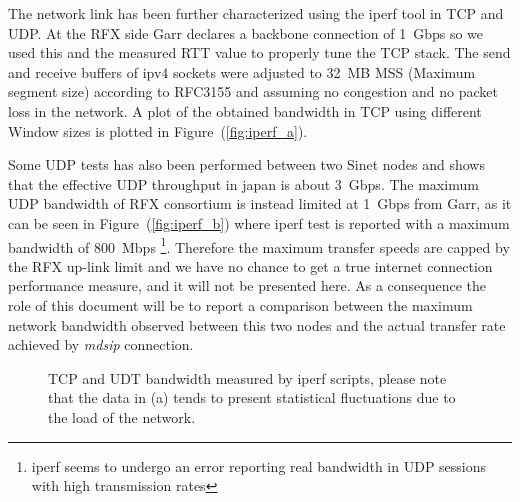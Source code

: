 \documentclass[10pt,a4paper]{article}
\begin{document}
The network link has been further characterized using the iperf tool in TCP and UDP. 
At the RFX side Garr declares a backbone connection of 1~Gbps so we used this and the measured RTT value to properly tune the TCP stack.
The send and receive buffers of ipv4 sockets were adjusted to 32~MB MSS (Maximum segment size) according to RFC3155 and assuming no congestion and no packet loss in the network.
A plot of the obtained bandwidth in TCP using different Window sizes is plotted in Figure~(\ref{fig:iperf_a}).

Some UDP tests has also been performed between two Sinet nodes and shows that the effective UDP throughput in japan is about 3~Gbps.
The maximum UDP bandwidth of RFX consortium is instead limited at 1~Gbps from Garr, as it can be seen in Figure~(\ref{fig:iperf_b}) where iperf test is reported with a maximum bandwidth of 800~Mbps
\footnote{iperf seems to undergo an error reporting real bandwidth in UDP sessions with high transmission rates}.
Therefore the maximum transfer speeds are capped by the RFX up-link limit and we have no chance to get a true internet connection performance measure, and it will not be presented here.
As a consequence the role of this document will be to report a comparison between the maximum network bandwidth observed between this two nodes and the actual transfer rate achieved by \emph{mdsip} connection.

\begin{figure}[htbp!]
\centerline{
}
\caption[]
{ TCP and UDT bandwidth measured by iperf scripts, please note that the data in (a) tends to present statistical fluctuations due to the load of the network. }
\label{fig:iprf}
\end{figure}
\end{document}
